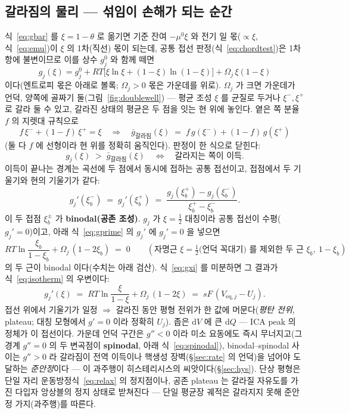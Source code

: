 \documentclass[11pt,a4paper]{article}
\newcommand{\dd}{\mathrm{d}}
\newcommand{\eq}{\mathrm{eq}}
\begin{document}
\subsection{갈라짐의 물리 — 섞임이 손해가 되는 순간}
식~\eqref{eq:gbar} 를 $\xi=1-\theta$ 로 옮기면 기준 잔여 $-\mu^0\xi$ 와 전기 일 몫($\propto\xi$, 식~\eqref{eq:emu})이 $\xi$ 의 1차(직선) 몫이 되는데, 공통 접선 판정(식~\eqref{eq:chordtest})은 1차항에 불변이므로 이를 상수 $g_j^0$ 와 함께 떼면
\begin{equation}
g_j(\xi)=g_j^0+RT\big[\xi\ln\xi+(1-\xi)\ln(1-\xi)\big]+\Omega_j\,\xi(1-\xi)
\label{eq:gxi}
\end{equation}
이다(엔트로피 몫은 아래로 볼록; $\Omega_j>0$ 몫은 가운데를 위로). $\Omega_j$ 가 크면 가운데가 언덕, 양쪽에 골짜기 둘(그림~\ref{fig:doublewell}) — 평균 조성 $\xi$ 를 균질로 두거나 $\xi^-,\xi^+$ 로 갈라 둘 수 있고, 갈라진 상태의 평균은 두 점을 잇는 현 위에 놓인다. 옅은 쪽 분율 $f$ 의 지렛대 규칙으로
\begin{equation}
f\,\xi^-+(1-f)\,\xi^+=\xi
\quad\Rightarrow\quad
\bar g_{\text{갈라짐}}(\xi)\;=\;f\,g(\xi^-)+(1-f)\,g(\xi^+)
\label{eq:lever}
\end{equation}
(둘 다 $f$ 에 선형이라 현 위를 정확히 움직인다). 판정이 한 식으로 닫힌다:
\begin{equation}
g_j(\xi)\;>\;\bar g_{\text{갈라짐}}(\xi)
\quad\Longleftrightarrow\quad
\text{갈라지는 쪽이 이득.}
\label{eq:chordtest}
\end{equation}
이득이 끝나는 경계는 곡선에 두 점에서 동시에 접하는 공통 접선이고, 접점에서 두 기울기와 현의 기울기가 같다:
\begin{equation}
g_j'(\xi_b^-)\;=\;g_j'(\xi_b^+)
\;=\;\frac{g_j(\xi_b^+)-g_j(\xi_b^-)}{\xi_b^+-\xi_b^-}.
\label{eq:cotangent}
\end{equation}
이 두 접점 $\xi_b^\pm$ 가 \textbf{binodal(공존 조성)}. $g_j$ 가 $\xi=\tfrac12$ 대칭이라 공통 접선이 수평($g_j'=0$)이고, 아래 식~\eqref{eq:gprime} 의 $g_j'$ 에 $g_j'=0$ 을 넣으면
\begin{equation}
RT\ln\frac{\xi_b}{1-\xi_b}+\Omega_j\,(1-2\xi_b)\;=\;0
\qquad(\text{자명근 }\xi=\tfrac12\text{(언덕 꼭대기) 를 제외한 두 근 }\xi_b,\ 1-\xi_b)
\label{eq:binodal}
\end{equation}
의 두 근이 binodal 이다(수치는 아래 검산). 식~\eqref{eq:gxi} 를 미분하면 그 결과가 식~\eqref{eq:isotherm} 의 우변이다:
\begin{equation}
g_j'(\xi)\;=\;RT\ln\frac{\xi}{1-\xi}+\Omega_j\,(1-2\xi)
\;=\;sF\,(V_{\eq,j}-U_j).
\label{eq:gprime}
\end{equation}
접선 위에서 기울기가 일정 $\Rightarrow$ 갈라진 동안 평형 전위가 한 값에 머문다(\emph{평탄 전위}, plateau; 대칭 모형에서 $g'=0$ 이라 정확히 $U_j$). 좁은 $\dd V$ 에 큰 $\dd Q$ — ICA peak 의 정체가 이 접선이다. 가운데 언덕 구간은 $g''<0$ 이라 미소 요동에도 즉시 무너지고(그 경계 $g''=0$ 의 두 변곡점이 \textbf{spinodal}, 아래 식~\eqref{eq:spinodal}), binodal--spinodal 사이는 $g''>0$ 라 갈라짐이 전역 이득이나 핵생성 장벽(\S\ref{sec:rate} 의 언덕)을 넘어야 도달하는 \emph{준안정}이다 — 이 과주행이 히스테리시스의 씨앗이다(\S\ref{sec:hys}). 단상 평형은 단일 자리 운동방정식~\eqref{eq:relax} 의 정지점이나, 공존 plateau 는 갈라질 자유도를 가진 다입자 앙상블의 정지 상태로 받쳐진다 — 단일 평균장 궤적은 갈라지지 못해 준안정 가지(과주행)를 따른다.
\end{document}
